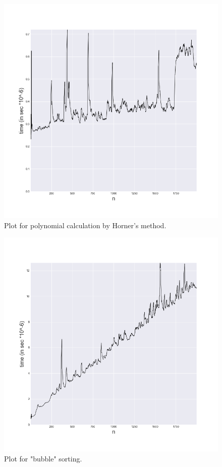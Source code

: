 \documentclass[a4paper,article,14pt]{extarticle}
\begin{document}
	\begin{figure}[h]
		\centering
		\includegraphics[scale=0.5]{horners.png}
		\caption{Plot for polynomial calculation by Horner's method.}
		\label{horners}
	\end{figure} 
	\begin{figure}[h]
		\centering
		\includegraphics[scale=0.5]{bubbleSort.png}
		\caption{Plot for "bubble" sorting.}
		\label{bubble}
	\end{figure} 
\end{document}
